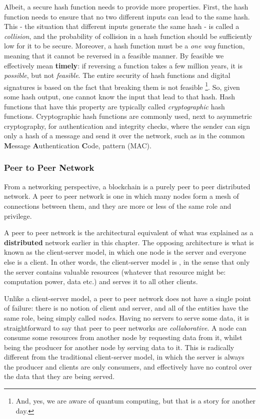 Albeit, a secure hash function needs to provide more properties. First, the hash function needs to
ensure that no two different inputs can lead to the same hash. This - the situation that different inputs generate the same hash - is called a \textit{collision}, and the probability of collision in a hash function should be sufficiently low for it to be secure. Moreover, a hash function must be a \textit{one way} function, meaning that it cannot be
reversed in a feasible manner. By feasible we effectively mean \textbf{timely}: if reversing a function takes a few million years, it is \textit{possible}, but not \textit{feasible}. The entire security of hash
functions and digital signatures is based on the fact that breaking them is not feasible
\footnote{And, yes, we are aware of quantum computing, but that is a story for another day.}. So,
given some hash output, one cannot know the input that lead to that hash. Hash functions that have
this property are typically called \textit{cryptographic} hash functions. Cryptographic hash
functions are commonly used, next to asymmetric cryptography, for authentication and integrity
checks, where the sender can sign only a hash of a message and send it over the network, such as in the
common \textbf{M}essage \textbf{A}uthentication \textbf{C}ode, pattern
\cite{bellareKeyingHashFunctions1996} (MAC).

\subsubsection{Peer to Peer Network} \label{chap_bg:subsec:p2p}

From a networking perspective, a blockchain is a purely peer to peer distributed network. A peer to
peer network is one in which many nodes form a mesh of connections between them, and they are more
or less of the same role and privilege.

A peer to peer network is the architectural equivalent of what was explained as a
\textbf{distributed} network earlier in this chapter. The opposing architecture is what is known as
the client-server model, in which one node is the server and everyone else is a client. In other
words, the client-server model is , in the sense that only the server contains
valuable resources (whatever that resource might be: computation power, data etc.) and serves it to
all other clients.

Unlike a client-server model, a peer to peer network does not have a single point of failure: there
is no notion of client and server, and all of the entities have the same role, being simply called
\textit{nodes}. Having no servers to serve some data, it is straightforward to say that peer to peer
networks are \textit{collaborative}. A node can consume some resources from another node by
requesting data from it, whilst being the producer for another node by serving data to it. This is
radically different from the traditional client-server model, in which the server is always the
producer and clients are only consumers, and effectively have no control over the data that they are
being served.

